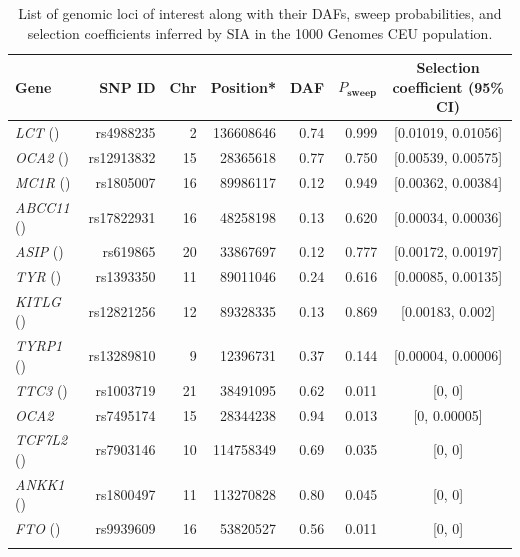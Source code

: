 \begin{table}
    
    \centering
    \caption{List of genomic loci of interest along with their \acfp{DAF}, sweep probabilities, and selection coefficients inferred by \ac{SIA} in the 1000 Genomes CEU population.}
    \vspace{5mm}
    \begin{tabular}{m{6cm} r r r r r c}
        \hline
        \textbf{Gene} & \textbf{SNP ID} & \textbf{Chr} & \textbf{Position}* & \textbf{\ac{DAF}} & $P_{\mathrm{\textbf{sweep}}}$ & \textbf{Selection coefficient (95\% CI)} \\
        \hline
        \textit{LCT} (\cite{bersaglieri_genetic_2004}) & rs4988235 & 2 & 136608646 & 0.74 & 0.999 & [0.01019, 0.01056] \\
        \textit{OCA2} (\cite{han_genome-wide_2008,sturm_single_2008}) & rs12913832 & 15 & 28365618 & 0.77 & 0.750 & [0.00539, 0.00575] \\
        \textit{MC1R} (\cite{sulem_genetic_2007,han_genome-wide_2008}) & rs1805007 & 16 & 89986117 & 0.12 & 0.949 & [0.00362, 0.00384] \\
        \textit{ABCC11} (\cite{yoshiura_snp_2006}) & rs17822931 & 16 & 48258198 & 0.13 & 0.620 & [0.00034, 0.00036] \\
        \textit{ASIP} (\cite{eriksson_web-based_2010}) & rs619865 & 20 & 33867697 & 0.12 & 0.777 & [0.00172, 0.00197] \\
        \textit{TYR} (\cite{sulem_genetic_2007,eriksson_web-based_2010}) & rs1393350 & 11 & 89011046 & 0.24 & 0.616 & [0.00085, 0.00135] \\
        \textit{KITLG} (\cite{sulem_genetic_2007}) & rs12821256 & 12 & 89328335 & 0.13 & 0.869 & [0.00183, 0.002] \\
        \textit{TYRP1} (\cite{kenny_melanesian_2012}) & rs13289810 & 9 & 12396731 & 0.37 & 0.144 & [0.00004, 0.00006] \\
        \textit{TTC3} (\cite{liu_digital_2010}) & rs1003719 & 21 & 38491095 & 0.62 & 0.011 & [0, 0] \\
        \textit{OCA2} & rs7495174 & 15 & 28344238 & 0.94 & 0.013 & [0, 0.00005] \\
        \textit{TCF7L2} (\cite{lyssenko_mechanisms_2007}) & rs7903146 & 10 & 114758349 & 0.69 & 0.035 & [0, 0] \\
        \textit{ANKK1} (\cite{spellicy_variant_2014}) & rs1800497 & 11 & 113270828 & 0.80 & 0.045 & [0, 0] \\
        \textit{FTO} (\cite{frayling_common_2007}) & rs9939609 & 16 & 53820527 & 0.56 & 0.011 & [0, 0] \\
        \hline
        \rowcolor{white} \multicolumn{7}{l}{*Genomic coordinates in GRCh37 (hg19) assembly}
    \end{tabular}
    \label{tab:SIA-T1}
\end{table}

